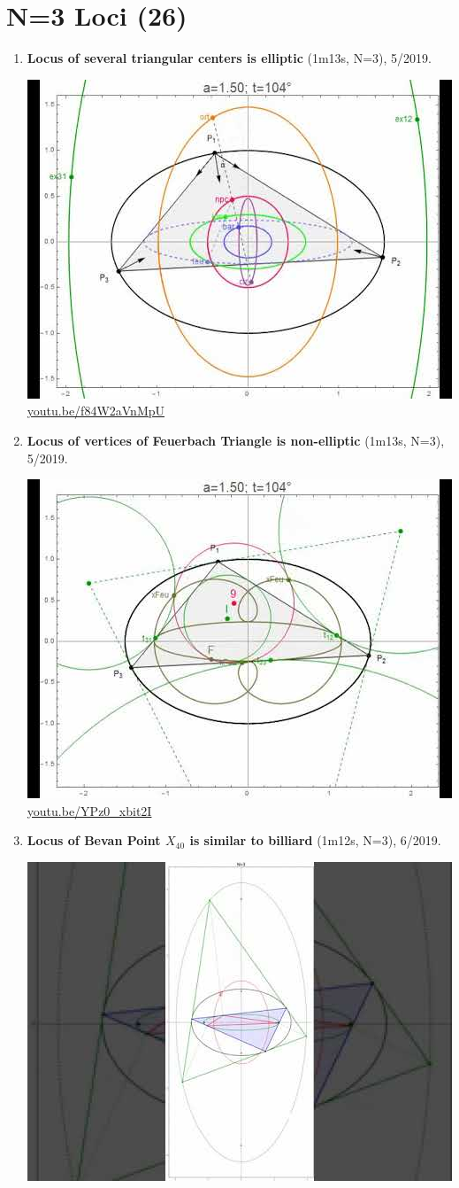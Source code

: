 \documentclass[12pt]{amsart}
\begin{document}
\section{N=3 Loci (26)}

\begin{enumerate}[resume]
\item \textbf{Locus of several triangular centers is elliptic} (1m13s, N=3), 5/2019. 
\begin{center}\includegraphics[width=.5\textwidth]{pics/f84W2aVnMpU.jpg} \\ 
\href{https://youtu.be/f84W2aVnMpU}{\url{youtu.be/f84W2aVnMpU}}\end{center}
% 
\item \textbf{Locus of vertices of Feuerbach Triangle is non-elliptic} (1m13s, N=3), 5/2019. 
\begin{center}\includegraphics[width=.5\textwidth]{pics/YPz0_xbit2I.jpg} \\ 
\href{https://youtu.be/YPz0_xbit2I}{\url{youtu.be/YPz0\_xbit2I}}\end{center}
% 
\item \textbf{Locus of Bevan Point $X_{40}$ is similar to billiard} (1m12s, N=3), 6/2019. 
\begin{center}\includegraphics[width=.5\textwidth]{pics/NwPioKleiyU.jpg} \\ 

\end{center}
\end{enumerate}
\end{document}
